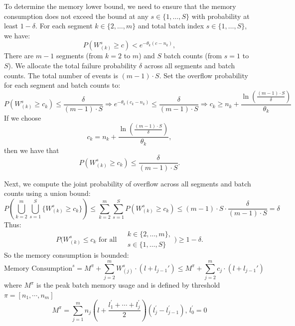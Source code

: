 \documentclass[preprint]{article}
\theoremstyle{plain}
\theoremstyle{definition}
\theoremstyle{remark}
\begin{document}
To determine the memory lower bound, we need to ensure that the memory consumption does not exceed the bound at any \( s \in \{1, \dots, S\} \) with probability at least \( 1 - \delta \). For each segment \( k \in \{2, \dots, m\} \) and total batch index \( s \in \{1, \dots, S\} \), we have:
\[ P\left( W^s_{(k)} \geq c \right) < e^{-\theta_k (c - n_k)}, \]
There are \( m - 1 \) segments (from \( k = 2 \) to \( m \)) and \( S  \) batch counts (from \( s = 1 \) to \( S \)). We allocate the total failure probability \( \delta \) across all segments and batch counts. The total number of events is \( (m - 1) \cdot S \). Set the overflow probability for each segment and batch counts to:
$$P\left( W^s_{(k)} \geq c_k \right) \leq \frac{\delta}{(m - 1) \cdot S}\Rightarrow e^{-\theta_k (c_k - n_k)} \leq \frac{\delta}{(m - 1) \cdot S}\Rightarrow c_k \geq n_k + \frac{\ln\left( \frac{(m - 1) \cdot S}{\delta} \right)}{\theta_k}$$
If we choose 
\[ c_k = n_k + \frac{\ln\left( \frac{(m - 1) \cdot S}{\delta} \right)}{\theta_k}, \]
then we have that
\[ P\left( W^s_{(k)} \geq c_k \right) \leq \frac{\delta}{(m - 1) \cdot S}. \]

Next, we compute the joint probability of overflow across all segments and batch counts using a union bound:
$$P\left( \bigcup_{k=2}^m \bigcup_{s=1}^S \{ W^s_{(k)} \geq c_k \} \right) \leq \sum_{k=2}^m \sum_{s=1}^S P\left( W^s_{(k)} \geq c_k \right)\leq (m - 1) \cdot S \cdot \frac{\delta}{(m - 1) \cdot S} = \delta$$
Thus:
$$P\bigg( W^s_{(k)} \leq c_k \text{ for all } 
\begin{aligned}
    &k \in \{2, \dots, m\}, \\
    &s \in \{1, \dots, S\} 
\end{aligned} \bigg) 
\geq 1 - \delta.$$
So the memory consumption is bounded:
$$    \text{Memory Consumption}^s 
= M^{\pi} + \sum_{j=2}^m W^s_{(j)} \cdot (l + l_{j-1}')\leq M^{\pi} + \sum_{j=2}^m c_j \cdot (l + l_{j-1}')$$
where $M^\pi$ is the peak batch
memory usage and is defined by threshold $\pi=[n_1,\cdots,n_m]$
$$M^\pi = \sum_{j=1}^m n_j \left( l + \frac{l_1^\prime + \cdots +l_{j}^\prime}{2} \right)\left( l_j^\prime - l_{j-1}^\prime \right), \, l_0^\prime =0$$
\end{document}
